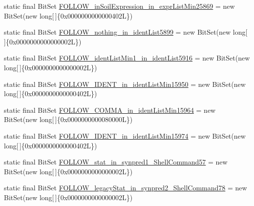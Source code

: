 \begin{DoxyCompactItemize}
\item 
static final Bit\-Set \hyperlink{classorg_1_1tzi_1_1use_1_1parser_1_1shell_1_1_shell_command_parser_ad119bf7b27f712112c590cc820ca1302}{F\-O\-L\-L\-O\-W\-\_\-in\-Soil\-Expression\-\_\-in\-\_\-expr\-List\-Min25869} = new Bit\-Set(new long\mbox{[}$\,$\mbox{]}\{0x0000000000000402\-L\})
\item 
static final Bit\-Set \hyperlink{classorg_1_1tzi_1_1use_1_1parser_1_1shell_1_1_shell_command_parser_ab802dcb831fa6ec7f0bfb66a7e8b708a}{F\-O\-L\-L\-O\-W\-\_\-nothing\-\_\-in\-\_\-ident\-List5899} = new Bit\-Set(new long\mbox{[}$\,$\mbox{]}\{0x0000000000000002\-L\})
\item 
static final Bit\-Set \hyperlink{classorg_1_1tzi_1_1use_1_1parser_1_1shell_1_1_shell_command_parser_acf1cc0a32cec8ca240887d2573f4fdf8}{F\-O\-L\-L\-O\-W\-\_\-ident\-List\-Min1\-\_\-in\-\_\-ident\-List5916} = new Bit\-Set(new long\mbox{[}$\,$\mbox{]}\{0x0000000000000002\-L\})
\item 
static final Bit\-Set \hyperlink{classorg_1_1tzi_1_1use_1_1parser_1_1shell_1_1_shell_command_parser_ae5daf7399ab72d2e9634124df7191c57}{F\-O\-L\-L\-O\-W\-\_\-\-I\-D\-E\-N\-T\-\_\-in\-\_\-ident\-List\-Min15950} = new Bit\-Set(new long\mbox{[}$\,$\mbox{]}\{0x0000000000000402\-L\})
\item 
static final Bit\-Set \hyperlink{classorg_1_1tzi_1_1use_1_1parser_1_1shell_1_1_shell_command_parser_a172004b41060d067e1b6e5c7bf579416}{F\-O\-L\-L\-O\-W\-\_\-\-C\-O\-M\-M\-A\-\_\-in\-\_\-ident\-List\-Min15964} = new Bit\-Set(new long\mbox{[}$\,$\mbox{]}\{0x0000000000080000\-L\})
\item 
static final Bit\-Set \hyperlink{classorg_1_1tzi_1_1use_1_1parser_1_1shell_1_1_shell_command_parser_a83bcd8ef273d17bcb12bcd4b958f049c}{F\-O\-L\-L\-O\-W\-\_\-\-I\-D\-E\-N\-T\-\_\-in\-\_\-ident\-List\-Min15974} = new Bit\-Set(new long\mbox{[}$\,$\mbox{]}\{0x0000000000000402\-L\})
\item 
static final Bit\-Set \hyperlink{classorg_1_1tzi_1_1use_1_1parser_1_1shell_1_1_shell_command_parser_a3e9b70eaf3dd0185db4f9c29ac7a75c5}{F\-O\-L\-L\-O\-W\-\_\-stat\-\_\-in\-\_\-synpred1\-\_\-\-Shell\-Command57} = new Bit\-Set(new long\mbox{[}$\,$\mbox{]}\{0x0000000000000002\-L\})
\item 
static final Bit\-Set \hyperlink{classorg_1_1tzi_1_1use_1_1parser_1_1shell_1_1_shell_command_parser_ad50a1355b54a029341ca95c06c4bb74e}{F\-O\-L\-L\-O\-W\-\_\-legacy\-Stat\-\_\-in\-\_\-synpred2\-\_\-\-Shell\-Command78} = new Bit\-Set(new long\mbox{[}$\,$\mbox{]}\{0x0000000000000002\-L\})

\end{DoxyCompactItemize}
